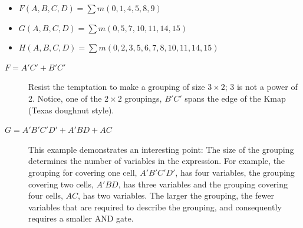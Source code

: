 \begin{process:minimizationKmap}
\begin{itemize}
\item $F(A,B,C,D) = \sum m(0,1,4,5,8,9)$
\item $G(A,B,C,D) = \sum m(0,5,7,10,11,14,15)$
\item $H(A,B,C,D) = \sum m(0,2,3,5,6,7,8,10,11,14,15)$
\end{itemize}

\begin{description}
\item [$F=A'C'+B'C'$]  
Resist the temptation to make a grouping of size $3 \times 2$;
3 is not a power of 2.  Notice, one of the $2 \times 2$
groupings, $B'C'$ spans the edge of the Kmap (Texas doughnut style).


\item [$G=A'B'C'D'+A'BD+AC$] 
This example demonstrates an interesting point: The size of the 
grouping determines the number of variables in the \SOPmin expression.
For example, the grouping for covering one cell, $A'B'C'D'$, has four
variables, the grouping covering two cells, $A'BD$, has three variables 
and the grouping covering four cells, $AC$, has two variables.  The 
larger the grouping, the fewer variables that are required to describe
the grouping, and consequently requires a smaller AND gate.


\end{description}
\end{process:minimizationKmap}
